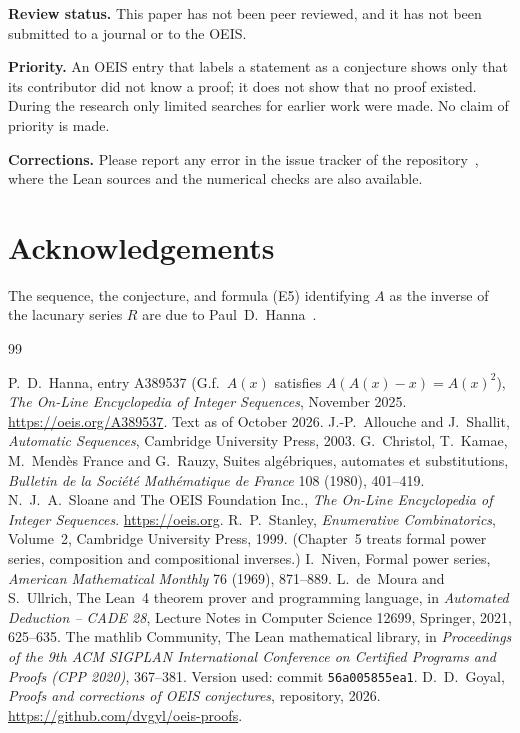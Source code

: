 \documentclass[11pt,a4paper]{article}
\theoremstyle{definition}
\theoremstyle{remark}
\newcommand{\para}[1]{\par\medskip\noindent\textbf{#1}\enspace}
\begin{document}
\para{Review status.} This paper has not been peer reviewed, and it has not been submitted to a journal or to the OEIS.

\para{Priority.} An OEIS entry that labels a statement as a conjecture shows only that its contributor did not know
a proof; it does not show that no proof existed. During the research only limited searches for earlier work were
made. No claim of priority is made.

\para{Corrections.} Please report any error in the issue tracker of the repository~\cite{repo}, where the Lean sources and the numerical checks are also
available.

\section*{Acknowledgements}
The sequence, the conjecture, and formula (E5) identifying $A$ as the inverse of the lacunary series $R$ are due to
Paul~D.~Hanna~\cite{oeis}.

\begin{thebibliography}{99}\small
\raggedright
{} P.~D.~Hanna, entry A389537 (G.f.\ $A(x)$ satisfies $A(A(x)-x)=A(x)^2$), \emph{The On-Line Encyclopedia of Integer Sequences}, November 2025. \url{https://oeis.org/A389537}. Text as of October 2026.
 J.-P.~Allouche and J.~Shallit, \emph{Automatic Sequences}, Cambridge University Press, 2003.
 G.~Christol, T.~Kamae, M.~Mend\`es France and G.~Rauzy, Suites alg\'ebriques, automates et substitutions, \emph{Bulletin de la Soci\'et\'e Math\'ematique de France} 108 (1980), 401--419.
 N.~J.~A.~Sloane and The OEIS Foundation Inc., \emph{The On-Line Encyclopedia of Integer Sequences}. \url{https://oeis.org}.
 R.~P.~Stanley, \emph{Enumerative Combinatorics}, Volume~2, Cambridge University Press, 1999. (Chapter~5 treats formal power series, composition and compositional inverses.)
 I.~Niven, Formal power series, \emph{American Mathematical Monthly} 76 (1969), 871--889.
 L.~de~Moura and S.~Ullrich, The Lean~4 theorem prover and programming language, in \emph{Automated Deduction -- CADE 28}, Lecture Notes in Computer Science 12699, Springer, 2021, 625--635.
 The mathlib Community, The Lean mathematical library, in \emph{Proceedings of the 9th ACM SIGPLAN International Conference on Certified Programs and Proofs (CPP 2020)}, 367--381. Version used: commit \texttt{56a005855ea1}.
 D.~D.~Goyal, \emph{Proofs and corrections of OEIS conjectures}, repository, 2026. \url{https://github.com/dvgyl/oeis-proofs}.
\end{thebibliography}
\end{document}
